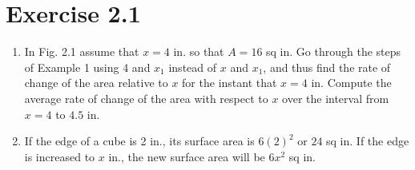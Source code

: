 \documentclass{report}
\begin{document}
\section{Exercise 2.1}
\begin{enumerate}
      \item In Fig. 2.1 assume that $x = 4$ in. so that $A = 16$ sq in. Go through the
            steps of Example 1 using 4 and $x_1$ instead of $x$ and $x_1$, and thus find
            the rate of change of the area relative to $x$ for the instant that $x = 4$ in.
            Compute the average rate of change of the area with respect to $x$ over the
            interval from $x = 4$ to $4.5$ in.
      \item If the edge of a cube is 2 in., its surface area is $6(2)^2$ or $24$ sq in. If
            the edge is increased to $x$ in., the new surface area will be $6x^2$ sq in.


\end{enumerate}
\end{document}
